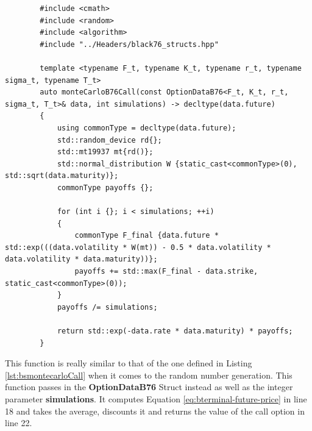 \documentclass[12pt]{article}
\numberwithin{equation}{section}
\begin{document}
\begin{listing}[H]
	\begin{verbatim}
		#include <cmath>
		#include <random>
		#include <algorithm>
		#include "../Headers/black76_structs.hpp"

		template <typename F_t, typename K_t, typename r_t, typename sigma_t, typename T_t>
		auto monteCarloB76Call(const OptionDataB76<F_t, K_t, r_t, sigma_t, T_t>& data, int simulations) -> decltype(data.future)
		{
			using commonType = decltype(data.future);
			std::random_device rd{};
			std::mt19937 mt{rd()};
			std::normal_distribution W {static_cast<commonType>(0), std::sqrt(data.maturity)};
			commonType payoffs {};
			
			for (int i {}; i < simulations; ++i)
			{
				commonType F_final {data.future * std::exp(((data.volatility * W(mt)) - 0.5 * data.volatility * data.volatility * data.maturity))};
				payoffs += std::max(F_final - data.strike, static_cast<commonType>(0));
			}
			payoffs /= simulations;
			
			return std::exp(-data.rate * data.maturity) * payoffs;
		}
	\end{verbatim}
	\caption{Black-76 Call using Monte Carlo Simulations}
	\label{lst:b76montecarloCall}
\end{listing}
\FloatBarrier
This function is really similar to that of the one defined in Listing \ref{lst:bsmontecarloCall}   when it comes to the random number generation. This function passes in the \textbf{OptionDataB76} Struct instead as well as the integer parameter \textbf{simulations}. It computes Equation \ref{eq:bterminal-future-price} in line 18 and takes the average, discounts it and returns the value of the call option in line 22.
\end{document}
